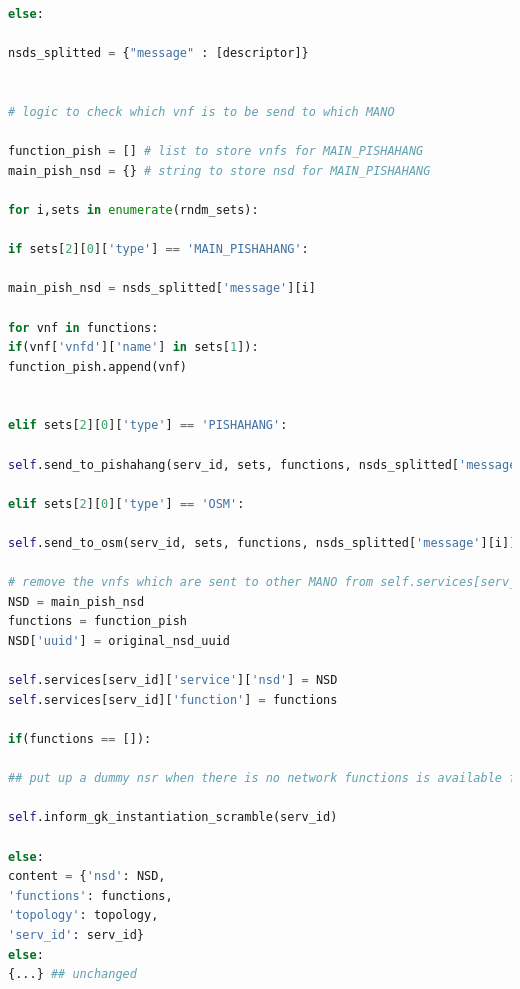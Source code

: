 \begin{lstlisting}[language=Python,caption=Extended \textbf{SLM\_mapping\_scramble} function, label=lis:SLM_scramble]
else:

nsds_splitted = {"message" : [descriptor]}


# logic to check which vnf is to be send to which MANO

function_pish = [] # list to store vnfs for MAIN_PISHAHANG
main_pish_nsd = {} # string to store nsd for MAIN_PISHAHANG

for i,sets in enumerate(rndm_sets):

if sets[2][0]['type'] == 'MAIN_PISHAHANG':

main_pish_nsd = nsds_splitted['message'][i]

for vnf in functions:
if(vnf['vnfd']['name'] in sets[1]):
function_pish.append(vnf)


elif sets[2][0]['type'] == 'PISHAHANG':

self.send_to_pishahang(serv_id, sets, functions, nsds_splitted['message'][i])

elif sets[2][0]['type'] == 'OSM':

self.send_to_osm(serv_id, sets, functions, nsds_splitted['message'][i])             

# remove the vnfs which are sent to other MANO from self.services[serv_id]['function']
NSD = main_pish_nsd
functions = function_pish
NSD['uuid'] = original_nsd_uuid

self.services[serv_id]['service']['nsd'] = NSD
self.services[serv_id]['function'] = functions

if(functions == []):

## put up a dummy nsr when there is no network functions is available for this mano. So as to keep the unique UUID of this instantiation request in ledger instead of forced rollback.

self.inform_gk_instantiation_scramble(serv_id)

else:
content = {'nsd': NSD,
'functions': functions,
'topology': topology,
'serv_id': serv_id} 
else:
{...} ## unchanged
\end{lstlisting}